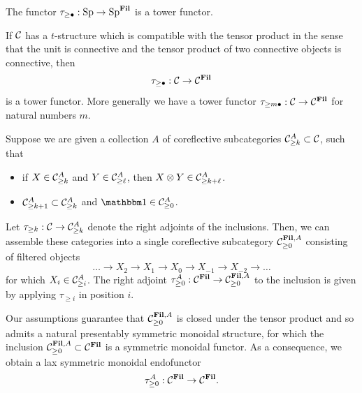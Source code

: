 \begin{exm}
  The functor $\tau_{\geq \bullet} : \operatorname{\mathrm{Sp}} \to \operatorname{\mathrm{Sp}}^{\operatorname{\mathbf{Fil}}}$ is a tower functor.
\end{exm}

\begin{exm}
  If $\mathcal{C}$ has a $t$-structure which is compatible with the tensor product in the sense that the unit is connective and the tensor product of two connective objects is connective, then
  \[ \tau_{\geq \bullet} : \mathcal{C} \to \mathcal{C}^{\operatorname{\mathbf{Fil}}} \]
  is a tower functor. More generally we have a tower functor
  $ \tau_{\geq m \bullet} : \mathcal{C} \to \mathcal{C}^{\operatorname{\mathbf{Fil}}} $ for natural numbers $m$.
\end{exm}

\begin{cnstr} \label{cnstr:trunc-tower}
  Suppose we are given a collection $A$ of coreflective subcategories $\mathcal{C}^A_{\geq k} \subset \mathcal{C}$,
  such that
  \begin{itemize}
  \item if $X \in \mathcal{C}^A_{\geq k}$ and $Y \in \mathcal{C}^A_{\geq \ell}$, then $X \otimes Y \in \mathcal{C}^A_{\geq k+\ell}$.
  \item $\mathcal{C}^A_{\geq k+1} \subset \mathcal{C}^A_{\geq k}$ and $\o \in \CC^A_{\geq 0}$.
  \end{itemize}

  Let $\tau_{\geq k} : \mathcal{C} \to \mathcal{C}^A_{\geq k}$ denote the right adjoints of the inclusions. 
  Then, we can assemble these categories into a single coreflective subcategory $\mathcal{C}_{\geq 0}^{\operatorname{\mathbf{Fil}}, A}$
  consisting of filtered objects
  \[\dots \to X_2 \to X_1 \to X_0 \to X_{-1} \to X_{-2} \to \dots\]
  for which $X_i \in \mathcal{C}^A_{\geq i}$.
  The right adjoint $\tau_{\geq 0}^A : \mathcal{C}^{\operatorname{\mathbf{Fil}}} \to \mathcal{C}^{\operatorname{\mathbf{Fil}}, A}_{\geq 0}$ to the inclusion is given by applying $\tau_{\geq i}$ in position $i$.

  Our assumptions guarantee that $\mathcal{C}_{\geq 0}^{\operatorname{\mathbf{Fil}}, A}$ is closed under the tensor product and so admits a natural presentably symmetric monoidal structure, for which the inclusion $\mathcal{C}^{\operatorname{\mathbf{Fil}}, A}_{\geq 0} \subset \mathcal{C}^{\operatorname{\mathbf{Fil}}}$ is a symmetric monoidal functor. As a consequence, we obtain a lax symmetric monoidal endofunctor  
   \[ \tau^A_{\geq 0} : \mathcal{C}^{\operatorname{\mathbf{Fil}}} \to \mathcal{C}^{\operatorname{\mathbf{Fil}}}. \]
\end{cnstr}

